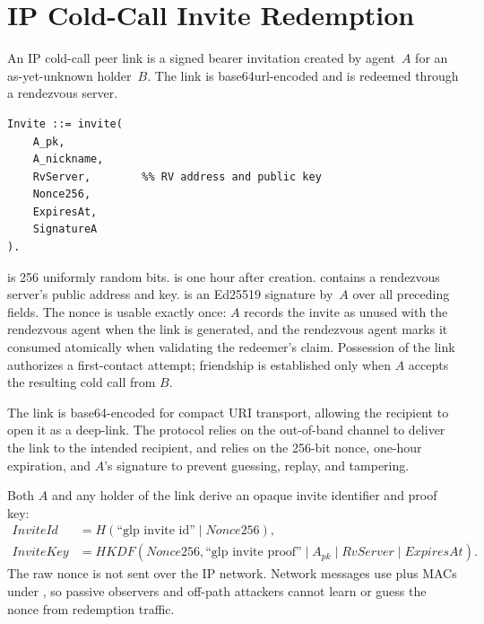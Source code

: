 \section{IP Cold-Call Invite Redemption}
\label{appendix:ip-cold-call-invites}
An IP cold-call peer link is a signed bearer invitation created by agent~$A$ for an as-yet-unknown holder~$B$.  The link is base64url-encoded and is redeemed through a rendezvous server.

\begin{verbatim}
Invite ::= invite(
    A_pk,
    A_nickname,
    RvServer,        %% RV address and public key
    Nonce256,
    ExpiresAt,
    SignatureA
).
\end{verbatim}

\noindent {} is 256 uniformly random bits.   is one hour after creation.  contains a rendezvous server's public address and key.  is an Ed25519 signature by~$A$ over all preceding fields. The nonce is usable exactly once: $A$ records the invite as unused with the rendezvous agent when the link is generated, and the rendezvous agent marks it consumed atomically when validating the redeemer's claim.  Possession of the link authorizes a first-contact attempt; friendship is established only when $A$ accepts the resulting cold call from $B$.

The link is base64-encoded for compact URI transport, allowing the recipient to open it as a deep-link.  The protocol relies on the out-of-band channel to deliver the link to the intended recipient, and relies on the 256-bit nonce, one-hour expiration, and $A$'s signature to prevent guessing, replay, and tampering.

Both $A$ and any holder of the link derive an opaque invite identifier and proof key:
\[
\begin{aligned}
\mathit{InviteId}  &= H(\text{``glp invite id''} \mid \mathit{Nonce256}),\\
\mathit{InviteKey} &= \mathit{HKDF}(\mathit{Nonce256},
    \text{``glp invite proof''} \mid A_{\mathit{pk}} \mid
    \mathit{RvServer} \mid \mathit{ExpiresAt}).
\end{aligned}
\]
The raw nonce is not sent over the IP network.  Network messages use  plus MACs under , so passive observers and off-path attackers cannot learn or guess the nonce from redemption traffic.

